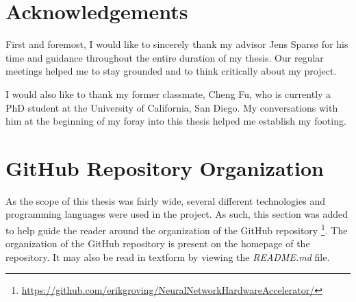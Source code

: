 \chapter{Acknowledgements}

First and foremost, I would like to sincerely thank my advisor Jens Sparsø for his time and guidance throughout the entire duration of my thesis. Our regular meetings helped me to stay grounded and to think critically about my project.

I would also like to thank my former classmate, Cheng Fu, who is currently a PhD student at the University of California, San Diego. My conversations with him at the beginning of my foray into this thesis helped me establish my footing.

\chapter{GitHub Repository Organization}
As the scope of this thesis was fairly wide, several different technologies and programming languages were used in the project. As such, this section was added to help guide the reader around the organization of the GitHub repository \footnote{\url{
		https://github.com/erikgroving/NeuralNetworkHardwareAccelerator/}}. 
The organization of the GitHub repository is present on the homepage of the repository. It may also be read in textform by viewing the \textit{README.md} file.
